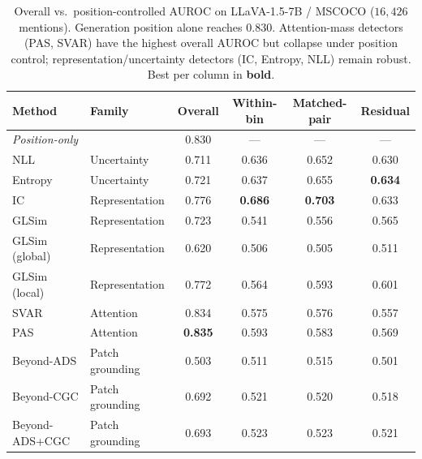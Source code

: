\begin{table}[t]
\centering
\small
\begin{tabular}{llcccc}
\toprule
Method & Family & Overall & Within-bin & Matched-pair & Residual \\
\midrule
\multicolumn{2}{l}{\emph{Position-only}} & 0.830 & --- & --- & --- \\
\midrule
NLL            & Uncertainty    & 0.711 & 0.636 & 0.652 & 0.630 \\
Entropy        & Uncertainty    & 0.721 & 0.637 & 0.655 & \textbf{0.634} \\
IC             & Representation & 0.776 & \textbf{0.686} & \textbf{0.703} & 0.633 \\
GLSim          & Representation & 0.723 & 0.541 & 0.556 & 0.565 \\
GLSim (global) & Representation & 0.620 & 0.506 & 0.505 & 0.511 \\
GLSim (local)  & Representation & 0.772 & 0.564 & 0.593 & 0.601 \\
SVAR           & Attention      & 0.834 & 0.575 & 0.576 & 0.557 \\
PAS            & Attention      & \textbf{0.835} & 0.593 & 0.583 & 0.569 \\
Beyond-ADS     & Patch grounding& 0.503 & 0.511 & 0.515 & 0.501 \\
Beyond-CGC     & Patch grounding& 0.692 & 0.521 & 0.520 & 0.518 \\
Beyond-ADS+CGC & Patch grounding& 0.693 & 0.523 & 0.523 & 0.521 \\
\bottomrule
\end{tabular}
\caption{Overall vs.\ position-controlled AUROC on LLaVA-1.5-7B / MSCOCO ($16{,}426$ mentions). Generation position alone reaches $0.830$. Attention-mass detectors (PAS, SVAR) have the highest overall AUROC but collapse under position control; representation/uncertainty detectors (IC, Entropy, NLL) remain robust. Best per column in \textbf{bold}.}
\label{tab:main}
\end{table}
